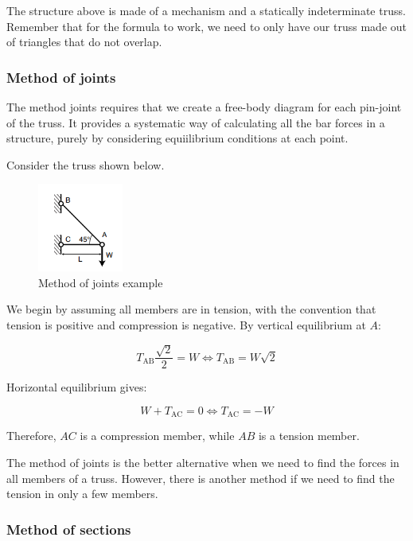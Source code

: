 \documentclass{article}
\begin{document}
The structure above is made of a mechanism and a statically indeterminate truss. Remember that for the formula to work, we need to only have our truss made out of triangles that do not overlap.

\subsubsection{Method of joints}

The method joints requires that we create a free-body diagram for each pin-joint of the truss. It provides a systematic way of calculating all the bar forces in a structure, purely by considering equiilibrium conditions at each point.

\begin{example}
    Consider the truss shown below. 

    \begin{figure}[h]
    \centering
    \includegraphics[width = 0.25\textwidth]{images/truss1.png}
    \caption{Method of joints example}
    \label{fig:enter-label}
    \end{figure}

    We begin by assuming all members are in tension, with the convention that tension is positive and compression is negative. By vertical equilibrium at $A$:

    \[ T_{\text{AB}}\frac{\sqrt{2}}{2} = W \iff T_{\text{AB}} = W\sqrt{2}\]

    Horizontal equilibrium gives:

    \[ W + T_{\text{AC}} = 0 \iff T_{\text{AC}} = -W \]

    Therefore, $AC$ is a compression member, while $AB$ is a tension member.
\end{example}

The method of joints is the better alternative when we need to find the forces in all members of a truss. However, there is another method if we need to find the tension in only a few members.

\subsubsection{Method of sections}
\end{document}
